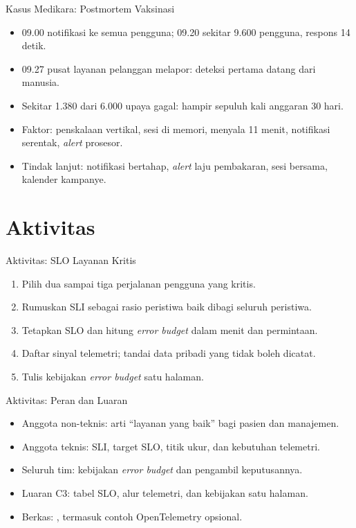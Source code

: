 \documentclass[aspectratio=169, table, 12pt]{beamer}
\begin{document}
\begin{frame}{{\Large Kasus Medikara: Postmortem Vaksinasi}}
  \vspace{6pt}
  \small
  \begin{itemize}
    \item 09.00 notifikasi ke semua pengguna; 09.20 sekitar 9.600 pengguna, respons 14
          detik.
    \item 09.27 pusat layanan pelanggan melapor: deteksi pertama datang dari manusia.
    \item Sekitar 1.380 dari 6.000 upaya gagal: hampir sepuluh kali anggaran 30 hari.
    \item Faktor: penskalaan vertikal, sesi di memori, menyala 11 menit, notifikasi
          serentak, \textit{alert} prosesor.
    \item Tindak lanjut: notifikasi bertahap, \textit{alert} laju pembakaran, sesi
          bersama, kalender kampanye.
  \end{itemize}
\end{frame}

\section{Aktivitas}

\begin{frame}{{\Large Aktivitas: SLO Layanan Kritis}}
  \vspace{6pt}
  \small
  \begin{enumerate}
    \item Pilih dua sampai tiga perjalanan pengguna yang kritis.
    \item Rumuskan SLI sebagai rasio peristiwa baik dibagi seluruh peristiwa.
    \item Tetapkan SLO dan hitung \textit{error budget} dalam menit dan permintaan.
    \item Daftar sinyal telemetri; tandai data pribadi yang tidak boleh dicatat.
    \item Tulis kebijakan \textit{error budget} satu halaman.
  \end{enumerate}
\end{frame}

\begin{frame}{{\Large Aktivitas: Peran dan Luaran}}
  \vspace{6pt}
  \small
  \begin{itemize}
    \item Anggota non-teknis: arti ``layanan yang baik'' bagi pasien dan manajemen.
    \item Anggota teknis: SLI, target SLO, titik ukur, dan kebutuhan telemetri.
    \item Seluruh tim: kebijakan \textit{error budget} dan pengambil keputusannya.
    \item Luaran C3: tabel SLO, alur telemetri, dan kebijakan satu halaman.
    \item Berkas: , termasuk contoh OpenTelemetry opsional.
  \end{itemize}
\end{frame}
\end{document}
